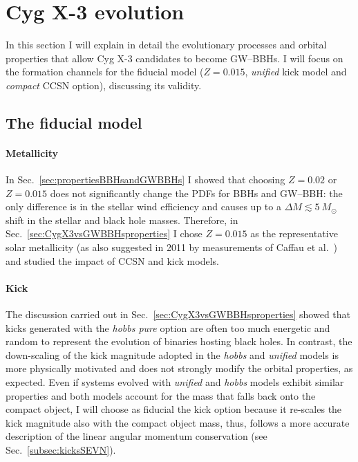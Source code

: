 \documentclass[a4paper,titlepage]{book}     	%
\newcommand{\sun}{\ensuremath{_\odot}}
\newcommand{\msun}{\ensuremath{M\sun}}
\begin{document}
\section{Cyg X-3 evolution}\label{sec:resultsCygX3evo}
In this section I will explain in detail the evolutionary processes and orbital properties that allow Cyg X-3 candidates to become GW--BBHs. I will focus on the formation channels for the fiducial model ($Z=0.015$, \emph{unified} kick model and \emph{compact} CCSN option), discussing its validity.

\subsection{The fiducial model}\label{subsec:fiducialCygX3}
\paragraph{Metallicity} In Sec.\ \ref{sec:propertiesBBHsandGWBBHs} I showed that choosing $Z=0.02$ or $Z=0.015$ does not significantly change the PDFs for BBHs and GW--BBH: the only difference is in the stellar wind efficiency and causes up to a $\Delta M \lesssim 5~\msun$ shift in the stellar and black hole masses. Therefore, in Sec.\ \ref{sec:CygX3vsGWBBHsproperties} I chose $Z=0.015$ as the representative solar metallicity (as also suggested in 2011 by measurements of Caffau et al.\ \cite{caffau2011solarmetallicity}) and studied the impact of CCSN and kick models.

\paragraph{Kick} The discussion carried out in Sec.\ \ref{sec:CygX3vsGWBBHsproperties} showed that kicks generated with the \emph{hobbs pure} option are often too much energetic and random to represent the evolution of binaries hosting black holes. In contrast, the down-scaling of the kick magnitude adopted in the \emph{hobbs} and \emph{unified} models is more physically motivated and does not strongly modify the orbital properties, as expected. Even if systems evolved with \emph{unified} and \emph{hobbs} models exhibit similar properties and both models account for the mass that falls back onto the compact object, I will choose as fiducial the kick option because it re-scales the kick magnitude also with the compact object mass, thus, follows a more accurate description of the linear angular momentum conservation (see Sec.\ \ref{subsec:kicksSEVN}).
\end{document}
